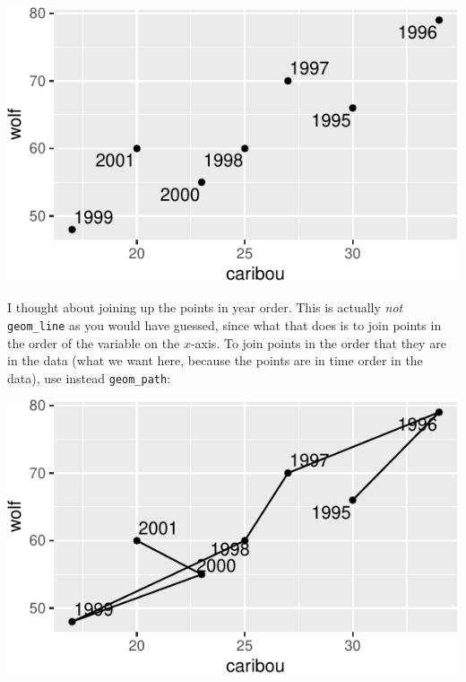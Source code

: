 \documentclass[]{tufte-book}
\newenvironment{Shaded}{}{}
\newcommand{\DataTypeTok}[1]{\textcolor[rgb]{0.56,0.13,0.00}{#1}}
\newcommand{\KeywordTok}[1]{\textcolor[rgb]{0.00,0.44,0.13}{\textbf{#1}}}
\newcommand{\NormalTok}[1]{#1}
\newcommand{\OperatorTok}[1]{\textcolor[rgb]{0.40,0.40,0.40}{#1}}
\newcommand{\StringTok}[1]{\textcolor[rgb]{0.25,0.44,0.63}{#1}}
\theoremstyle{definition}
\theoremstyle{definition}
\theoremstyle{definition}
\theoremstyle{remark}
\begin{document}
\includegraphics{13-dates-and-times_files/figure-latex/unnamed-chunk-33-1}

I thought about joining up the points in year order. This is actually
\emph{not} \texttt{geom\_line} as you would have guessed, since what
that does is to join points in the order of the variable on the
\(x\)-axis.
 To
join points in the order that they are in the data (what we want here,
because the points are in time order in the data), use instead
\texttt{geom\_path}:

\begin{Shaded}
\end{Shaded}

\includegraphics{13-dates-and-times_files/figure-latex/unnamed-chunk-34-1}
\end{document}

